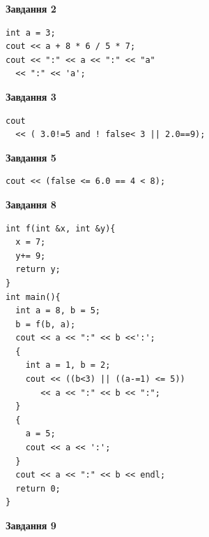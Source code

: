 \documentclass[12pt, ukrainian]{article}
\begin{document}
{\begin {large}
\begin{minipage}[t]{7.0cm}
\end{minipage}
\vline \hspace{1mm}
\begin{minipage}[t]{11.0cm}

\begin{center}
\textbf{Завдання 2}
\end{center}
\vspace{-8mm}

\begin{verbatim}
int a = 3;
cout << a + 8 * 6 / 5 * 7;
cout << ":" << a << ":" << "a" 
  << ":" << 'a';
\end{verbatim}



\begin{center}
\textbf{Завдання 3}
\end{center}
\vspace{-8mm}

\begin{verbatim}
cout 
  << ( 3.0!=5 and ! false< 3 || 2.0==9);
\end{verbatim}



\begin{center}
\textbf{Завдання 5}
\end{center}
\vspace{-8mm}

\begin{verbatim}
cout << (false <= 6.0 == 4 < 8);
\end{verbatim}



\begin{center}
\textbf{Завдання 8}
\end{center}
\vspace{-8mm}

\begin{verbatim}
int f(int &x, int &y){
  x = 7;
  y+= 9;
  return y;
}
int main(){
  int a = 8, b = 5;
  b = f(b, a);
  cout << a << ":" << b <<':';
  {
    int a = 1, b = 2;
    cout << ((b<3) || ((a-=1) <= 5))
       << a << ":" << b << ":";
  }
  {
    a = 5;
    cout << a << ':';
  }
  cout << a << ":" << b << endl;
  return 0;
}
\end{verbatim}

\end{minipage}


\begin{minipage}[t]{7.0cm}

\begin{center}
\textbf{Завдання 9}
\end{center}
\vspace{-8mm}


\end{minipage}
\end{large}}
\end{document}
